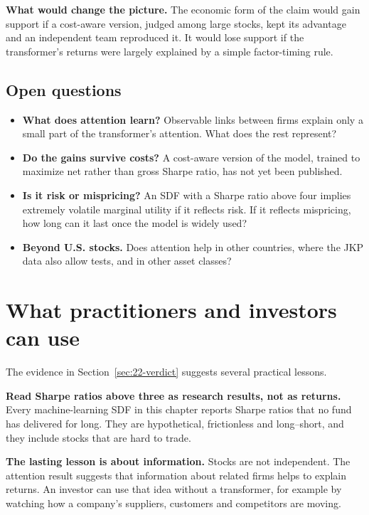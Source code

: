 \textbf{What would change the picture.} The economic form of the claim would gain support if a cost-aware version, judged among large stocks, kept its advantage and an independent team reproduced it. It would lose support if the transformer's returns were largely explained by a simple factor-timing rule.

\subsection{Open questions}
\label{sec:22-open}

\begin{itemize}
  \item \textbf{What does attention learn?} Observable links between firms explain only a small part of the transformer's attention. What does the rest represent?
  \item \textbf{Do the gains survive costs?} A cost-aware version of the model, trained to maximize net rather than gross Sharpe ratio, has not yet been published.
  \item \textbf{Is it risk or mispricing?} An SDF with a Sharpe ratio above four implies extremely volatile marginal utility if it reflects risk. If it reflects mispricing, how long can it last once the model is widely used?
  \item \textbf{Beyond U.S. stocks.} Does attention help in other countries, where the JKP data also allow tests, and in other asset classes?
\end{itemize}

\section{What practitioners and investors can use}
\label{sec:22-investors}

The evidence in Section~\ref{sec:22-verdict} suggests several practical lessons.

\textbf{Read Sharpe ratios above three as research results, not as returns.} Every machine-learning SDF in this chapter reports Sharpe ratios that no fund has delivered for long. They are hypothetical, frictionless and long--short, and they include stocks that are hard to trade.

\textbf{The lasting lesson is about information.} Stocks are not independent. The attention result suggests that information about related firms helps to explain returns. An investor can use that idea without a transformer, for example by watching how a company's suppliers, customers and competitors are moving.

